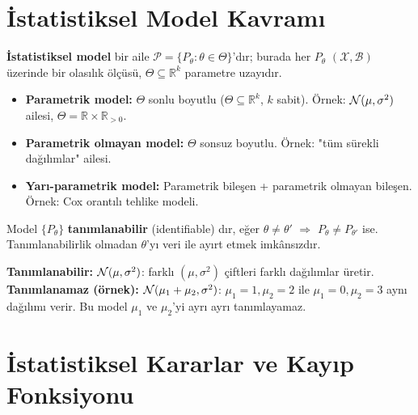 \section{İstatistiksel Model Kavramı}
\label{sec:istatistik_model}

\begin{tanim}
\label{def:istatistik_model}
\textbf{İstatistiksel model} bir aile $\mathcal{P} = \{P_\theta : \theta \in \Theta\}$'dır;
burada her $P_\theta$ $(\mathcal{X}, \mathcal{B})$ üzerinde bir olasılık ölçüsü,
$\Theta \subseteq \mathbb{R}^k$ parametre uzayıdır.

\begin{itemize}
  \item \textbf{Parametrik model:} $\Theta$ sonlu boyutlu ($\Theta \subseteq \mathbb{R}^k$, $k$ sabit).
        Örnek: $\mathcal{N}(\mu, \sigma^2)$ ailesi, $\Theta = \mathbb{R}\times\mathbb{R}_{>0}$.
  \item \textbf{Parametrik olmayan model:} $\Theta$ sonsuz boyutlu.
        Örnek: "tüm sürekli dağılımlar" ailesi.
  \item \textbf{Yarı-parametrik model:} Parametrik bileşen + parametrik olmayan bileşen.
        Örnek: Cox orantılı tehlike modeli.
\end{itemize}
\end{tanim}

\begin{tanim}[Tanımlanabilirlik]
\label{def:tanimlanabilirlik}
Model $\{P_\theta\}$ \textbf{tanımlanabilir} (identifiable) dır, eğer
$\theta \neq \theta'$ $\Rightarrow$ $P_\theta \neq P_{\theta'}$ ise.
Tanımlanabilirlik olmadan $\theta$'yı veri ile ayırt etmek imkânsızdır.
\end{tanim}

\begin{ornek}
\textbf{Tanımlanabilir:} $\mathcal{N}(\mu, \sigma^2)$: farklı $(\mu,\sigma^2)$ çiftleri
farklı dağılımlar üretir.\\
\textbf{Tanımlanamaz (örnek):} $\mathcal{N}(\mu_1+\mu_2, \sigma^2)$:
$\mu_1=1, \mu_2=2$ ile $\mu_1=0, \mu_2=3$ aynı dağılımı verir.
Bu model $\mu_1$ ve $\mu_2$'yi ayrı ayrı tanımlayamaz.
\end{ornek}

\section{İstatistiksel Kararlar ve Kayıp Fonksiyonu}
\label{sec:karar_teorisi}

